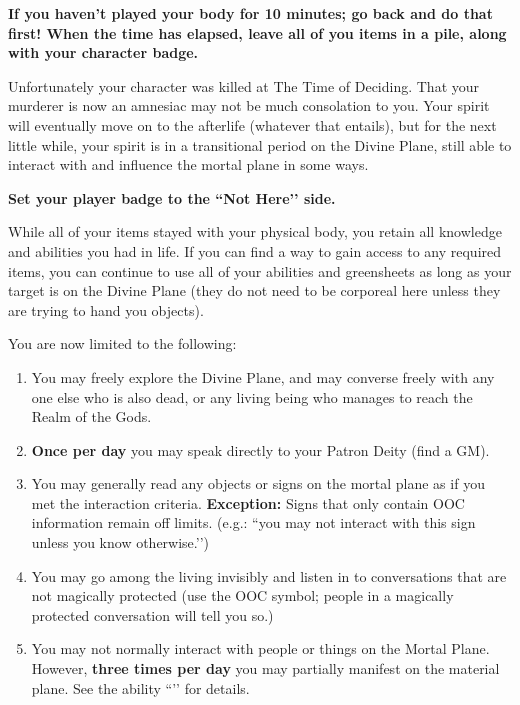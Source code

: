 \documentclass[green]{GL2020}
\begin{document}
\name{\gLifeAfterDeath{}}

\textbf{If you haven't played your body for 10 minutes; go back and do that first! When the time has elapsed, leave all of you items in a pile, along with your character badge.}

Unfortunately your character was killed at The Time of Deciding. That your murderer is now an amnesiac may not be much consolation to you. Your spirit will eventually move on to the afterlife (whatever that entails), but for the next little while, your spirit is in a transitional period on the Divine Plane, still able to interact with and influence the mortal plane in some ways.

\textbf{Set your player badge to the ``Not Here’’ side.}

While all of your items stayed with your physical body, you retain all knowledge and abilities you had in life. If you can find a way to gain access to any required items, you can continue to use all of your abilities and greensheets as long as your target is on the Divine Plane (they do not need to be corporeal here unless they are trying to hand you objects).

You are now limited to the following:
\begin{enumerate}
  \item You may freely explore the Divine Plane, and may converse freely with any one else who is also dead, or any living being who manages to reach the Realm of the Gods.
  \item \textbf{Once per day} you may speak directly to your Patron Deity (find a GM).
  \item You may generally read any objects or signs on the mortal plane as if you met the interaction criteria. \textbf{Exception:} Signs that only contain OOC information remain off limits. (e.g.: ``you may not interact with this sign unless you know otherwise.’’)
  \item You may go among the living invisibly and listen in to conversations that are not magically protected (use the OOC symbol; people in a magically protected conversation will tell you so.)
  \item You may not normally interact with people or things on the Mortal Plane. However, \textbf{three times per day} you may partially manifest on the material plane. See the ability ``\aGhostlyMessage{}’’ for details. 
\end{enumerate}
\end{document}
